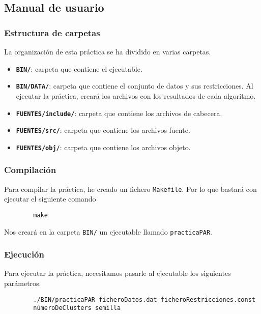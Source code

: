 	\subsection{Manual de usuario}
		\subsubsection{Estructura de carpetas}
			La organización de esta práctica se ha dividido en varias carpetas.
			
			\begin{itemize}
				\item \textbf{\lstinline!BIN/!}: carpeta que contiene el ejecutable.
				\item \textbf{\lstinline!BIN/DATA/!}: carpeta que contiene el conjunto de datos y sus restricciones.
				Al ejecutar la práctica, creará los archivos con los resultados de cada algoritmo.
				\item \textbf{\lstinline!FUENTES/include/!}: carpeta que contiene los archivos de cabecera.
				\item \textbf{\lstinline!FUENTES/src/!}: carpeta que contiene los archivos fuente.
				\item \textbf{\lstinline!FUENTES/obj/!}: carpeta que contiene los archivos objeto.
			\end{itemize}

		\subsubsection{Compilación}
			Para compilar la práctica, he creado un fichero \lstinline!Makefile!. Por lo que bastará con ejecutar el siguiente comando
		
		\footnotesize
		\begin{lstlisting}
		make
		\end{lstlisting}
		\normalsize

			Nos creará en la carpeta \lstinline!BIN/! un ejecutable llamado \lstinline!practicaPAR!.

		\subsubsection{Ejecución}
			Para ejecutar la práctica, necesitamos pasarle al ejecutable los siguientes parámetros.

		\footnotesize
		\begin{lstlisting}
		./BIN/practicaPAR ficheroDatos.dat ficheroRestricciones.const 
		númeroDeClusters semilla
		\end{lstlisting}
		\normalsize

